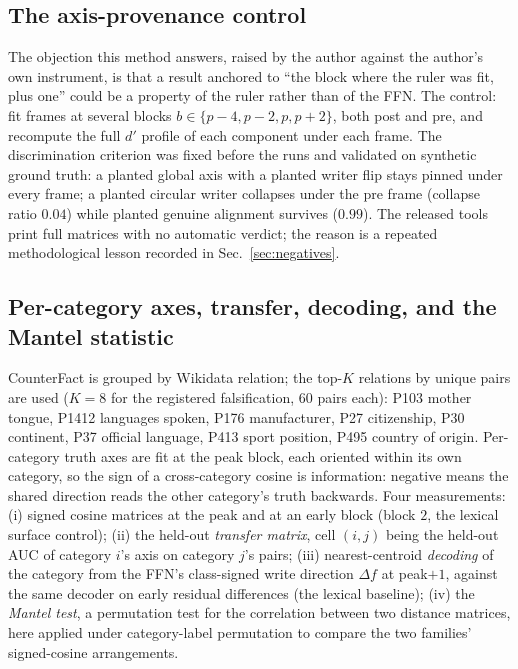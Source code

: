 \documentclass[11pt]{article}
\begin{document}
\subsection{The axis-provenance control}
\label{sec:provenance}

The objection this method answers, raised by the author against the
author's own instrument, is that a result anchored to ``the block where the
ruler was fit, plus one'' could be a property of the ruler rather than of
the FFN. The control: fit frames at several blocks
$b \in \{p{-}4, p{-}2, p, p{+}2\}$, both post and pre, and recompute the
full $d'$ profile of each component under each frame. The discrimination
criterion was fixed before the runs and validated on synthetic ground
truth: a planted global axis with a planted writer flip stays pinned under
every frame; a planted circular writer collapses under the pre frame
(collapse ratio $0.04$) while planted genuine alignment survives ($0.99$).
The released tools print full matrices with no automatic verdict; the
reason is a repeated methodological lesson recorded in
Sec.~\ref{sec:negatives}.

\subsection{Per-category axes, transfer, decoding, and the Mantel statistic}
\label{sec:catmethods}

CounterFact is grouped by Wikidata relation; the top-$K$ relations by
unique pairs are used ($K{=}8$ for the registered falsification, $60$ pairs
each): P103 mother tongue, P1412 languages spoken, P176 manufacturer, P27
citizenship, P30 continent, P37 official language, P413 sport position,
P495 country of origin. Per-category truth axes are fit at the peak block,
each oriented within its own category, so the sign of a cross-category
cosine is information: negative means the shared direction reads the other
category's truth backwards. Four measurements: (i) signed cosine matrices
at the peak and at an early block (block $2$, the lexical surface control);
(ii) the held-out \emph{transfer matrix}, cell $(i,j)$ being the held-out
AUC of category $i$'s axis on category $j$'s pairs; (iii) nearest-centroid
\emph{decoding} of the category from the FFN's class-signed write direction
$\Delta f$ at peak$+1$, against the same decoder on early residual
differences (the lexical baseline); (iv) the \emph{Mantel test}, a
permutation test for the correlation between two distance matrices, here
applied under category-label permutation to compare the two families'
signed-cosine arrangements.
\end{document}
